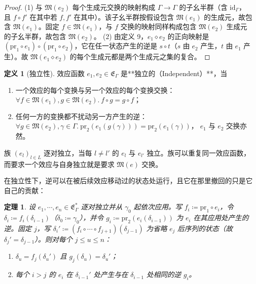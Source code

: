 \documentclass[11pt,a4paper]{article}
\theoremstyle{plain}
\newtheorem{theorem}{定理}
\theoremstyle{definition}
\newtheorem{definition}{定义}
\theoremstyle{remark}
\begin{document}
\begin{proof}
(1) 与 $\mathfrak{M}(e_2)$ 每个生成元交换的映射构成 $\Gamma \to \Gamma$ 的子幺半群（含 $\mathrm{id}_\Gamma$，且 $f \circ f'$ 在其中若 $f, f'$ 在其中）。该子幺半群按假设包含 $\mathfrak{M}(e_1)$ 的生成元，故包含 $\mathfrak{M}(e_1)$。固定 $f \in \mathfrak{M}(e_1)$，与 $f$ 交换的映射同样构成包含 $\mathfrak{M}(e_2)$ 生成元的子幺半群，故包含 $\mathfrak{M}(e_2)$。
(2) 由定义 9，$e_1 \diamond e_2$ 的正向映射是 $(\mathrm{pr}_1 \circ e_1) \circ (\mathrm{pr}_1 \circ e_2)$，它在任一状态产生的逆是 $s \circ t$（$s$ 由 $e_2$ 产生，$t$ 由 $e_1$ 产生）。故 $\mathfrak{M}(e_1 \diamond e_2)$ 的每个生成元都是两个生成元之集的复合。
\end{proof}

\begin{definition}[独立性]
效应函数 $e_1, e_2 \in \mathfrak{E}_\Gamma$ 是**独立的（Independent）**，当
\begin{enumerate}
\item 一个效应的每个变换与另一个效应的每个变换交换：
$\forall f \in \mathfrak{M}(e_1), g \in \mathfrak{M}(e_2).\ f \circ g = g \circ f$；
\item 任何一方的变换都不扰动另一方产生的逆：
$\forall g \in \mathfrak{M}(e_2), \gamma \in \Gamma.\ \mathrm{pr}_2(e_1(g(\gamma))) = \mathrm{pr}_2(e_1(\gamma))$，
$e_1$ 与 $e_2$ 交换亦然。
\end{enumerate}
\end{definition}

族 $(e_l)_{l \in L}$ 逐对独立，当每 $l \neq l'$ 的 $e_l$ 与 $e_{l'}$ 独立。族可以重复同一效应函数，而要求一个效应与自身独立就是要求 $\mathfrak{M}(e)$ 交换。

在独立性下，逆可以在被后续效应移动过的状态处运行，且它在那里撤回的只是它自己的贡献：

\begin{theorem}\label{thm:independent-revert}
设 $e_1, \cdots, e_n \in \mathfrak{E}_\Gamma^\ast$ 逐对独立并从 $\gamma_0$ 起依次应用。写 $f_i \coloneqq \mathrm{pr}_1 \circ e_i$，令 $\delta_i \coloneqq f_i(\delta_{i-1})$（$\delta_0 \coloneqq \gamma_0$），并令 $g_i \coloneqq \mathrm{pr}_2(e_i(\delta_{i-1}))$ 为 $e_i$ 在其应用处产生的逆。固定 $j$，写 $\delta_i' \coloneqq (f_i \circ \cdots \circ f_{j+1})(\delta_{j-1})$ 为省略 $e_j$ 后序列的状态（故 $\delta_j' = \delta_{j-1}$）。则对每个 $j \le u \le n$：
\begin{enumerate}
\item $\delta_u = f_j(\delta_u')$ 且 $g_j(\delta_u) = \delta_u'$；
\item 每个 $i > j$ 的 $e_i$ 在 $\delta_{i-1}'$ 处产生与在 $\delta_{i-1}$ 处相同的逆 $g_i$。
\end{enumerate}
\end{theorem}
\end{document}
